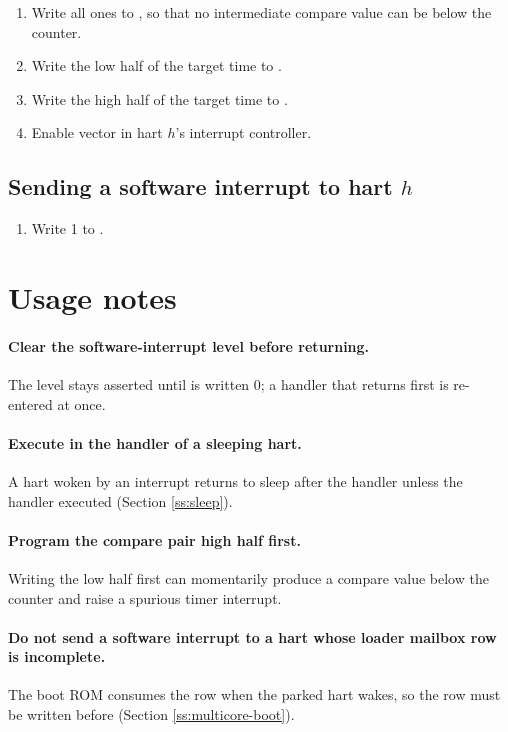 \begin{enumerate}
	\item Write all ones to , so that no intermediate compare value can be below the counter.
	\item Write the low half of the target time to .
	\item Write the high half of the target time to .
	\item Enable vector \ClintMtipVector{} in hart $h$'s interrupt controller.
\end{enumerate}

\subsection{Sending a software interrupt to hart $h$}

\begin{enumerate}
	\item Write 1 to .
\end{enumerate}

\section{Usage notes}

\paragraph{Clear the software-interrupt level before returning.} The level stays asserted until  is written 0; a handler that returns first is re-entered at once.

\paragraph{Execute  in the handler of a sleeping hart.} A hart woken by an interrupt returns to sleep after the handler unless the handler executed  (Section \ref{ss:sleep}).

\paragraph{Program the compare pair high half first.} Writing the low half first can momentarily produce a compare value below the counter and raise a spurious timer interrupt.

\paragraph{Do not send a software interrupt to a hart whose loader mailbox row is incomplete.} The boot ROM consumes the row when the parked hart wakes, so the row must be written before  (Section \ref{ss:multicore-boot}).
